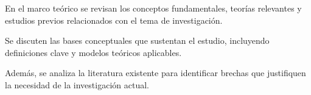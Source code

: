 
En el marco teórico se revisan los conceptos fundamentales, teorías relevantes y estudios previos relacionados con el tema de investigación.

Se discuten las bases conceptuales que sustentan el estudio, incluyendo definiciones clave y modelos teóricos aplicables.

Además, se analiza la literatura existente para identificar brechas que justifiquen la necesidad de la investigación actual.